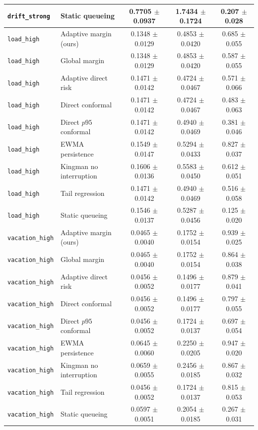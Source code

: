 \begin{tabular}{llccc}
\texttt{drift\_strong} & Static queueing & 0.7705 $\pm$ 0.0937 & 1.7434 $\pm$ 0.1724 & 0.207 $\pm$ 0.028 \\
\hline
\texttt{load\_high} & Adaptive margin (ours) & 0.1348 $\pm$ 0.0129 & 0.4853 $\pm$ 0.0420 & 0.685 $\pm$ 0.055 \\
\texttt{load\_high} & Global margin & 0.1348 $\pm$ 0.0129 & 0.4853 $\pm$ 0.0420 & 0.587 $\pm$ 0.055 \\
\texttt{load\_high} & Adaptive direct risk & 0.1471 $\pm$ 0.0142 & 0.4724 $\pm$ 0.0467 & 0.571 $\pm$ 0.066 \\
\texttt{load\_high} & Direct conformal & 0.1471 $\pm$ 0.0142 & 0.4724 $\pm$ 0.0467 & 0.483 $\pm$ 0.063 \\
\texttt{load\_high} & Direct $p95$ conformal & 0.1471 $\pm$ 0.0142 & 0.4940 $\pm$ 0.0469 & 0.381 $\pm$ 0.046 \\
\texttt{load\_high} & EWMA persistence & 0.1549 $\pm$ 0.0147 & 0.5294 $\pm$ 0.0433 & 0.827 $\pm$ 0.037 \\
\texttt{load\_high} & Kingman no interruption & 0.1606 $\pm$ 0.0136 & 0.5583 $\pm$ 0.0450 & 0.612 $\pm$ 0.051 \\
\texttt{load\_high} & Tail regression & 0.1471 $\pm$ 0.0142 & 0.4940 $\pm$ 0.0469 & 0.516 $\pm$ 0.058 \\
\texttt{load\_high} & Static queueing & 0.1546 $\pm$ 0.0137 & 0.5287 $\pm$ 0.0456 & 0.125 $\pm$ 0.020 \\
\hline
\texttt{vacation\_high} & Adaptive margin (ours) & 0.0465 $\pm$ 0.0040 & 0.1752 $\pm$ 0.0154 & 0.939 $\pm$ 0.025 \\
\texttt{vacation\_high} & Global margin & 0.0465 $\pm$ 0.0040 & 0.1752 $\pm$ 0.0154 & 0.864 $\pm$ 0.038 \\
\texttt{vacation\_high} & Adaptive direct risk & 0.0456 $\pm$ 0.0052 & 0.1496 $\pm$ 0.0177 & 0.879 $\pm$ 0.041 \\
\texttt{vacation\_high} & Direct conformal & 0.0456 $\pm$ 0.0052 & 0.1496 $\pm$ 0.0177 & 0.797 $\pm$ 0.055 \\
\texttt{vacation\_high} & Direct $p95$ conformal & 0.0456 $\pm$ 0.0052 & 0.1724 $\pm$ 0.0137 & 0.697 $\pm$ 0.054 \\
\texttt{vacation\_high} & EWMA persistence & 0.0645 $\pm$ 0.0060 & 0.2250 $\pm$ 0.0205 & 0.947 $\pm$ 0.020 \\
\texttt{vacation\_high} & Kingman no interruption & 0.0659 $\pm$ 0.0055 & 0.2456 $\pm$ 0.0185 & 0.867 $\pm$ 0.032 \\
\texttt{vacation\_high} & Tail regression & 0.0456 $\pm$ 0.0052 & 0.1724 $\pm$ 0.0137 & 0.815 $\pm$ 0.053 \\
\texttt{vacation\_high} & Static queueing & 0.0597 $\pm$ 0.0051 & 0.2054 $\pm$ 0.0185 & 0.267 $\pm$ 0.031 \\
\hline
\end{tabular}

